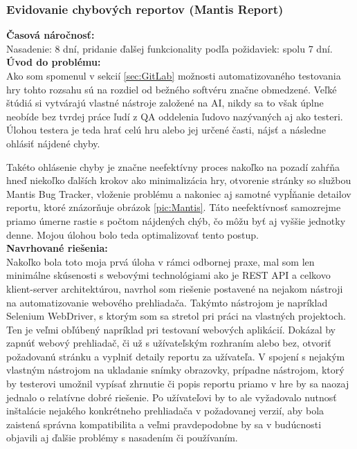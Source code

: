 \documentclass[slovak,bachelorpractice,dept460,male,csharp,cpdeclaration]{diploma}
\begin{document}
\subsubsection{Evidovanie chybových reportov (Mantis Report)}
\label{sec:Report}
\textbf{Časová náročnosť:} \\ Nasadenie: 8 dní, pridanie ďalšej funkcionality podľa požidaviek: spolu 7 dní.\\
\textbf{Úvod do problému:} \\ Ako som spomenul v sekcií \ref{sec:GitLab} možnosti automatizovaného testovania hry tohto rozsahu sú na rozdiel od bežného softvéru značne obmedzené. Veľké štúdiá si vytvárajú vlastné nástroje založené na AI, nikdy sa to však úplne neobíde bez tvrdej práce ľudí z QA oddelenia ľudovo nazývaných aj ako testeri. Úlohou testera je teda hrať celú hru alebo jej určené časti, nájsť a následne ohlásiť nájdené chyby. 

Takéto ohlásenie chyby je značne neefektívny proces nakoľko na pozadí zahŕňa hneď niekoľko ďalších krokov ako minimalizácia hry, otvorenie stránky so službou Mantis Bug Tracker, vloženie problému a nakoniec aj samotné vypĺňanie detailov reportu, ktoré znázorňuje obrázok \ref{pic:Mantis}.
Táto neefektívnosť samozrejme priamo úmerne rastie s počtom nájdených chýb, čo môžu byť aj vyššie jednotky denne. Mojou úlohou bolo teda optimalizovať tento postup. \\
\textbf{Navrhované riešenia:} \\ Nakoľko bola toto moja prvá úloha v rámci odbornej praxe, mal som len minimálne skúsenosti s webovými technológiami ako je REST API a celkovo klient-server architektúrou, navrhol som riešenie postavené na nejakom nástroji na automatizovanie webového prehliadača. Takýmto nástrojom je napríklad Selenium WebDriver, s ktorým som sa stretol pri práci na vlastných projektoch. Ten je veľmi obľúbený napríklad pri testovaní webových aplikácií. Dokázal by zapnúť webový prehliadač, či už s užívateľským rozhraním alebo bez, otvoriť požadovanú stránku a vyplniť detaily reportu za užívateľa. V spojení s nejakým vlastným nástrojom na ukladanie snímky obrazovky, prípadne nástrojom, ktorý by testerovi umožnil vypísať zhrnutie či popis reportu priamo v hre by sa naozaj jednalo o relatívne dobré riešenie. Po užívateľovi by to ale vyžadovalo nutnosť inštalácie nejakého konkrétneho prehliadača v požadovanej verzií, aby bola zaistená správna kompatibilita a veľmi pravdepodobne by sa v budúcnosti objavili aj ďalšie problémy s nasadením či používaním. 
\end{document}
